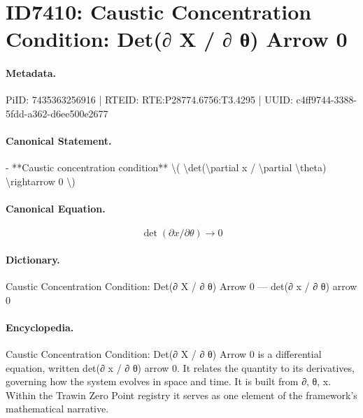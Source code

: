 \section*{ID7410: Caustic Concentration Condition: Det(∂ X / ∂ θ) Arrow 0}
\paragraph{Metadata.}
PiID: 7435363256916 | RTEID: RTE:P28774.6756:T3.4295 | UUID: c4ff9744-3388-5fdd-a362-d6ee500e2677

\paragraph{Canonical Statement.}
- **Caustic concentration condition** \textbackslash{}( \textbackslash{}det(\textbackslash{}partial x / \textbackslash{}partial \textbackslash{}theta) \textbackslash{}rightarrow 0 \textbackslash{})

\paragraph{Canonical Equation.}
\[
\det(\partial x / \partial \theta) \rightarrow 0
\]

\paragraph{Dictionary.}
Caustic Concentration Condition: Det(∂ X / ∂ θ) Arrow 0 — det(∂ x / ∂ θ) arrow 0

\paragraph{Encyclopedia.}
Caustic Concentration Condition: Det(∂ X / ∂ θ) Arrow 0 is a differential equation, written det(∂ x / ∂ θ) arrow 0. It relates the quantity to its derivatives, governing how the system evolves in space and time. It is built from ∂, θ, x. Within the Trawin Zero Point registry it serves as one element of the framework's mathematical narrative.
